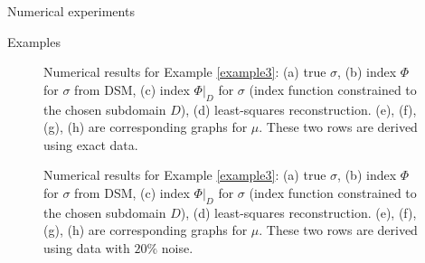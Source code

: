 \documentclass[11pt]{article}%
\renewcommand{\_}{{\fontfamily{ptm}\selectfont\textunderscore}}
\theoremstyle{plain}
\numberwithin{equation}{section}
\begin{document}
\begin{section}{Numerical experiments}
\begin{subsection}{Examples}
\begin{figure}[ht!]
\caption{Numerical results for Example \ref{example3}: (a) true $\sigma$, (b) index $\Phi$ for $\sigma$ from DSM, (c) index $\Phi|_D$ for $\sigma$ (index function constrained to the chosen subdomain $D$), (d) least-squares reconstruction. (e), (f), (g), (h) are corresponding graphs for $\mu$. These two rows are derived using exact data.}
\label{Ex126.main}
\end{figure}





\begin{figure}[ht!]
\centering
{}
\caption{Numerical results for Example \ref{example3}: (a) true $\sigma$, (b) index $\Phi$ for $\sigma$ from DSM, (c) index $\Phi|_D$ for $\sigma$ (index function constrained to the chosen subdomain $D$), (d) least-squares reconstruction. (e), (f), (g), (h) are corresponding graphs for $\mu$.  These two rows are derived using data  with $20\%$ noise.}
\label{Ex127.main}
\end{figure}


\end{subsection}
\end{section}
\end{document}

